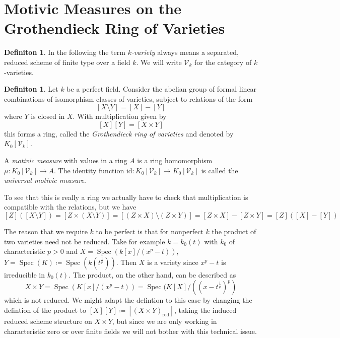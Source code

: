 \documentclass[11pt, a4paper, german]{article}
\theoremstyle{plain}
\theoremstyle{definition}
\newtheorem{definition}[theorem]{Definiton}
\newcommand{\gring}[1][k]{K_0[\mathcal{V}_#1]}
\DeclareMathOperator{\Spec}{Spec}
\begin{document}
\section{Motivic Measures on the Grothendieck Ring of Varieties}
\label{sec1}
\begin{definition}
    In the following the term \emph{$k$-variety} always means a separated, reduced scheme of finite type over a field $k$.
    We will write $\mathcal{V}_k$ for the category of $k$-varieties.
\end{definition}

\begin{definition}
    \label{gringdef}
    Let $k$ be a perfect field. 
    Consider the abelian group of formal linear combinations of isomorphism classes of varieties, subject to relations of the form
    \[
        [X \setminus Y] = [X] - [Y]
    \] where $Y$ is closed in $X$.
    With multiplication given by
    \[
        [X][Y] = [X \times Y]
    \]
    this forms a ring, called the \emph{Grothendieck ring of varieties} and denoted by $\gring$. 
    
    A \emph{motivic measure} with values in a ring $A$ is a ring homomorphism $\mu \colon \gring \to A$. The identity function
    $\mathrm{id} \colon \gring \to \gring$ is called the \emph{universal motivic measure}.
\end{definition}

To see that this is really a ring we actually have to check that multiplication is compatible with the relations, but we have
\[
    [Z] ([X \setminus Y]) = [Z \times (X \setminus Y)] = [(Z \times X) \setminus (Z \times Y)] = [Z \times X] - [Z \times Y] = [Z]([X] - [Y])
\]

The reason that we require $k$ to be perfect is that for nonperfect $k$ the product of two varieties need not be reduced. Take for example
$k = k_0(t)$ with $k_0$ of characteristic $p > 0$ and $X = \Spec(k[x]/(x^p - t))$, $Y = \Spec(K) \coloneqq \Spec(k(t^{\frac{1}{p}}))$. 
Then $X$ is a variety since $x^p - t$ is irreducible in $k_0(t)$. The product, on the other hand, can be described as
    \[
        X \times Y = \Spec(K[x]/(x^p -t)) = \Spec(K[X]/((x-t^{\frac{1}{p}})^p)
    \]
which is not reduced. We might adapt the defintion to this case by changing the defintion of the product to 
$[X][Y] \coloneqq [(X \times Y)_{\text{red}}]$, taking the induced reduced scheme structure on $X \times Y$, but since we are only working
in characteristic zero or over finite fields we will not bother with this technical issue.
\end{document}
